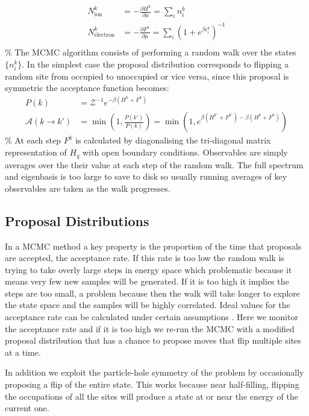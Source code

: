 \[\begin{aligned}
N^k_{\mathrm{ion}} &= - \frac{\partial H^k}{\partial \mu} = \sum_i n^k_i\\
N^k_{\mathrm{electron}} &= - \frac{\partial F^k}{\partial \mu} = \sum_i \left(1 + e^{\beta \epsilon^k_i}\right)^{-1}\\
\end{aligned}\] \% The MCMC algorithm consists of performing a random walk over the states \(\{ n^k_i \}\). In the simplest case the proposal distribution corresponds to flipping a random site from occupied to unoccupied or vice versa, since this proposal is symmetric the acceptance function becomes: \[\begin{aligned} 
P(k) &= \mathcal{Z}^{-1} e^{-\beta(H^k + F^k)} \\
\mathcal{A}(k \to k') &= \min\left(1, \frac{P(k')}{P(k)}\right) = \min\left(1, e^{\beta(H^{k'} + F^{k'})-\beta(H^k + F^k)}\right)
\end{aligned}\] \% At each step \(F^k\) is calculated by diagonalising the tri-diagonal matrix representation of \(H_q\) with open boundary conditions. Observables are simply averages over the their value at each step of the random walk. The full spectrum and eigenbasis is too large to save to disk so usually running averages of key observables are taken as the walk progresses.

\hypertarget{proposal-distributions}{%
\subsection{Proposal Distributions}\label{proposal-distributions}}

In a MCMC method a key property is the proportion of the time that proposals are accepted, the acceptance rate. If this rate is too low the random walk is trying to take overly large steps in energy space which problematic because it means very few new samples will be generated. If it is too high it implies the steps are too small, a problem because then the walk will take longer to explore the state space and the samples will be highly correlated. Ideal values for the acceptance rate can be calculated under certain assumptions \autocite{robertsWeakConvergenceOptimal1997}. Here we monitor the acceptance rate and if it is too high we re-run the MCMC with a modified proposal distribution that has a chance to propose moves that flip multiple sites at a time.

In addition we exploit the particle-hole symmetry of the problem by occasionally proposing a flip of the entire state. This works because near half-filling, flipping the occupations of all the sites will produce a state at or near the energy of the current one.

